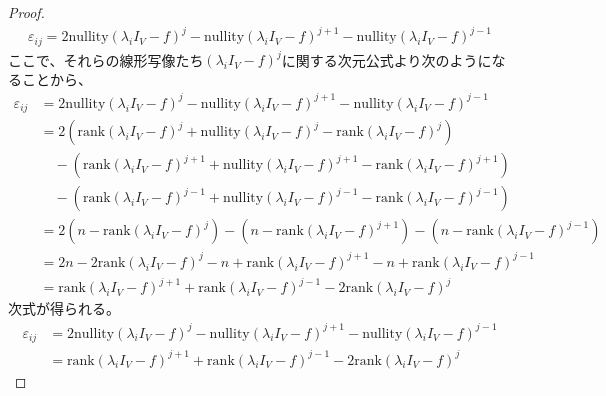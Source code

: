 \documentclass[dvipdfmx]{jsarticle}
\begin{document}
\begin{proof}
\begin{align*}
\varepsilon_{ij} = 2{\mathrm{nullity}}\left( \lambda_{i}I_{V} - f \right)^{j} - {\mathrm{nullity}}\left( \lambda_{i}I_{V} - f \right)^{j + 1} - {\mathrm{nullity}}\left( \lambda_{i}I_{V} - f \right)^{j - 1}
\end{align*}
ここで、それらの線形写像たち$\left( \lambda_{i}I_{V} - f \right)^{j}$に関する次元公式より次のようになることから、
\begin{align*}
\varepsilon_{ij} &= 2{\mathrm{nullity}}\left( \lambda_{i}I_{V} - f \right)^{j} - {\mathrm{nullity}}\left( \lambda_{i}I_{V} - f \right)^{j + 1} - {\mathrm{nullity}}\left( \lambda_{i}I_{V} - f \right)^{j - 1}\\
&= 2\left( {\mathrm{rank}}\left( \lambda_{i}I_{V} - f \right)^{j} + {\mathrm{nullity}}\left( \lambda_{i}I_{V} - f \right)^{j} - {\mathrm{rank}}\left( \lambda_{i}I_{V} - f \right)^{j} \right) \\
&\quad - \left( {\mathrm{rank}}\left( \lambda_{i}I_{V} - f \right)^{j + 1} + {\mathrm{nullity}}\left( \lambda_{i}I_{V} - f \right)^{j + 1} - {\mathrm{rank}}\left( \lambda_{i}I_{V} - f \right)^{j + 1} \right) \\
&\quad - \left( {\mathrm{rank}}\left( \lambda_{i}I_{V} - f \right)^{j - 1} + {\mathrm{nullity}}\left( \lambda_{i}I_{V} - f \right)^{j - 1} - {\mathrm{rank}}\left( \lambda_{i}I_{V} - f \right)^{j - 1} \right)\\
&= 2\left( n - {\mathrm{rank}}\left( \lambda_{i}I_{V} - f \right)^{j} \right) - \left( n - {\mathrm{rank}}\left( \lambda_{i}I_{V} - f \right)^{j + 1} \right) - \left( n - {\mathrm{rank}}\left( \lambda_{i}I_{V} - f \right)^{j - 1} \right)\\
&= 2n - 2{\mathrm{rank}}\left( \lambda_{i}I_{V} - f \right)^{j} - n + {\mathrm{rank}}\left( \lambda_{i}I_{V} - f \right)^{j + 1} - n + {\mathrm{rank}}\left( \lambda_{i}I_{V} - f \right)^{j - 1}\\
&= {\mathrm{rank}}\left( \lambda_{i}I_{V} - f \right)^{j + 1} + {\mathrm{rank}}\left( \lambda_{i}I_{V} - f \right)^{j - 1} - 2{\mathrm{rank}}\left( \lambda_{i}I_{V} - f \right)^{j}
\end{align*}
次式が得られる。
\begin{align*}
\varepsilon_{ij} &= 2{\mathrm{nullity}}\left( \lambda_{i}I_{V} - f \right)^{j} - {\mathrm{nullity}}\left( \lambda_{i}I_{V} - f \right)^{j + 1} - {\mathrm{nullity}}\left( \lambda_{i}I_{V} - f \right)^{j - 1}\\
&= {\mathrm{rank}}\left( \lambda_{i}I_{V} - f \right)^{j + 1} + {\mathrm{rank}}\left( \lambda_{i}I_{V} - f \right)^{j - 1} - 2{\mathrm{rank}}\left( \lambda_{i}I_{V} - f \right)^{j}

\end{align*}
\end{proof}
\end{document}
